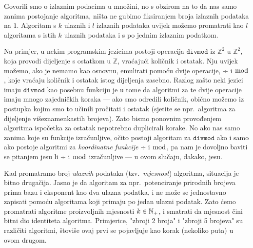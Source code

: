 
\begin{napomena}[{name=[samo jedan izlazni podatak]}]\label{nap:brip}
Govorili smo o izlaznim podacima u množini, no s obzirom na to da nas samo zanima postojanje algoritma, ništa ne gubimo fiksiranjem broja izlaznih podataka na $1$. Algoritam s $k$ ulaznih i $l$ izlaznih podataka uvijek možemo promatrati kao $l$ algoritama s istih $k$ ulaznih podataka i s po jednim izlaznim podatkom.

    Na primjer, u nekim programskim jezicima postoji operacija $\texttt{divmod}$ iz $\mathbb Z^2$ u $\mathbb Z^2$, koja provodi dijeljenje s ostatkom u $\mathbb Z$, vraćajući količnik i ostatak. Nju uvijek možemo, ako je nemamo kao osnovnu, emulirati pomoću dvije operacije, $\div$ i $\bmod$, koje vraćaju količnik i ostatak istog dijeljenja zasebno. Razlog zašto neki jezici imaju $\texttt{divmod}$ kao posebnu funkciju je u tome da algoritmi za te dvije operacije imaju mnogo zajedničkih koraka --- ako smo odredili količnik, obično možemo iz postupka kojim smo to učinili pročitati i ostatak (sjetite se npr.\ algoritma za dijeljenje višeznamenkastih brojeva). Zato bismo ponovnim provođenjem algoritma ispočetka za ostatak nepotrebno duplicirali korake. No ako nas samo zanima koje su funkcije izračunljive, očito postoji algoritam za $\texttt{divmod}$ ako i samo ako postoje algoritmi za \emph{koordinatne funkcije} $\div$ i $\bmod$, pa nam je dovoljno baviti se pitanjem jesu li $\div$ i $\bmod$ izračunljive --- u ovom slučaju, dakako, jesu.
\end{napomena}

Kad promatramo broj \emph{ulaznih} podataka (tzv\!.\ \emph{mjesnost}) algoritma, situacija je bitno drugačija. Jasno je da algoritam za npr.\ potenciranje prirodnih brojeva prima bazu i eksponent kao dva ulazna podatka, i ne može se jednostavno zapisati pomoću algoritama koji primaju po jedan ulazni podatak. %
Zato ćemo promatrati algoritme proizvoljnih mjesnosti $k\in{\mathbb N}_+$, i smatrati da mjesnost čini bitni dio identiteta algoritma. Primjerice, "zbroji 2 broja" i "zbroji 5 brojeva" su različiti algoritmi, štoviše ovaj prvi se pojavljuje kao korak (nekoliko puta) u ovom drugom.

